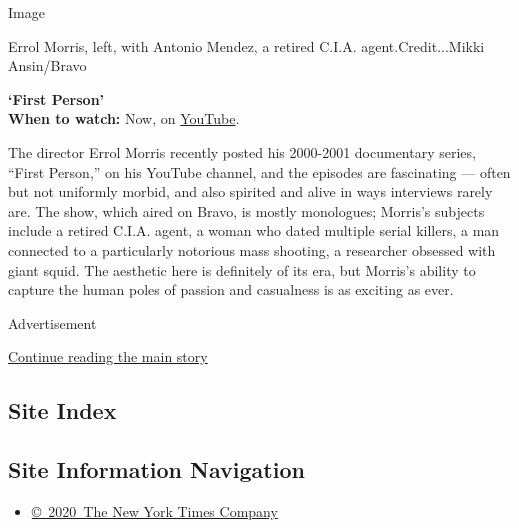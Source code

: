 Image

Errol Morris, left, with Antonio Mendez, a retired C.I.A.
agent.Credit...Mikki Ansin/Bravo

\textbf{`First Person'}\\
\textbf{When to watch:} Now, on
\href{https://www.youtube.com/watch?v=IhyNRRJPOb4\&list=PLVmRJGCDzW4QL42BGfwC-QpMMl46zDGJ9}{YouTube}.

The director Errol Morris recently posted his 2000-2001 documentary
series, ``First Person,'' on his YouTube channel, and the episodes are
fascinating --- often but not uniformly morbid, and also spirited and
alive in ways interviews rarely are. The show, which aired on Bravo, is
mostly monologues; Morris's subjects include a retired C.I.A. agent, a
woman who dated multiple serial killers, a man connected to a
particularly notorious mass shooting, a researcher obsessed with giant
squid. The aesthetic here is definitely of its era, but Morris's ability
to capture the human poles of passion and casualness is as exciting as
ever.

Advertisement

\protect\hyperlink{after-bottom}{Continue reading the main story}

\hypertarget{site-index}{%
\subsection{Site Index}\label{site-index}}

\hypertarget{site-information-navigation}{%
\subsection{Site Information
Navigation}\label{site-information-navigation}}

\begin{itemize}
\tightlist
\item
  \href{https://help.nytimes.com/hc/en-us/articles/115014792127-Copyright-notice}{©~2020~The
  New York Times Company}
\end{itemize}

